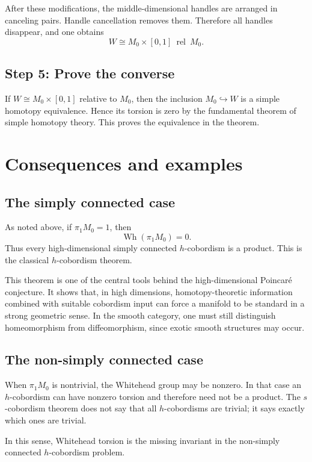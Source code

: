 \documentclass[11pt,a4paper]{article}
\newcommand{\Wh}{\operatorname{Wh}}
\newcommand{\rel}{\operatorname{rel}}
\theoremstyle{definition}
\theoremstyle{plain}
\theoremstyle{remark}
\begin{document}
After these modifications, the middle-dimensional handles are arranged in canceling pairs. Handle cancellation removes them. Therefore all handles disappear, and one obtains
\[
  W\cong M_0\times[0,1]\ \rel\ M_0.
\]

\subsection{Step 5: Prove the converse}

If \(W\cong M_0\times[0,1]\) relative to \(M_0\), then the inclusion \(M_0\hookrightarrow W\) is a simple homotopy equivalence. Hence its torsion is zero by the fundamental theorem of simple homotopy theory. This proves the equivalence in the theorem.

\section{Consequences and examples}

\subsection{The simply connected case}

As noted above, if \(\pi_1M_0=1\), then
\[
  \Wh(\pi_1M_0)=0.
\]
Thus every high-dimensional simply connected \(h\)-cobordism is a product. This is the classical \(h\)-cobordism theorem.

This theorem is one of the central tools behind the high-dimensional Poincar\'e conjecture. It shows that, in high dimensions, homotopy-theoretic information combined with suitable cobordism input can force a manifold to be standard in a strong geometric sense. In the smooth category, one must still distinguish homeomorphism from diffeomorphism, since exotic smooth structures may occur.

\subsection{The non-simply connected case}

When \(\pi_1M_0\) is nontrivial, the Whitehead group may be nonzero. In that case an \(h\)-cobordism can have nonzero torsion and therefore need not be a product. The \(s\)-cobordism theorem does not say that all \(h\)-cobordisms are trivial; it says exactly which ones are trivial.

In this sense, Whitehead torsion is the missing invariant in the non-simply connected \(h\)-cobordism problem.
\end{document}
